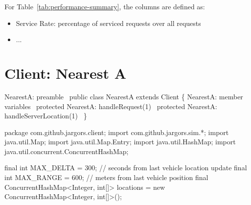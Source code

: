 For Table~\ref{tab:performance-summary}, the columns are defined as:

\begin{itemize}
\item Service Rate: percentage of serviced requests over all requests
\item ...
\end{itemize}


\nwenddocs{}\chapter{Client: Nearest A}
\label{client-nearest-a}

\nwenddocs{}\endmoddef\nwstartdeflinemarkup\nwenddeflinemarkup
\LA{}NearestA: preamble~{\nwtagstyle{}}\RA{}
public class NearestA extends Client \{
  \LA{}NearestA: member variables~{\nwtagstyle{}}\RA{}
  protected \LA{}NearestA: handleRequest(1)~{\nwtagstyle{}}\RA{}
  protected \LA{}NearestA: handleServerLocation(1)~{\nwtagstyle{}}\RA{}
\}
\nwendcode{}\nwdocspar

\nwenddocs{}\endmoddef\nwstartdeflinemarkup{}\nwenddeflinemarkup
package com.github.jargors.client;
import com.github.jargors.sim.*;
import java.util.Map;
import java.util.Map.Entry;
import java.util.HashMap;
import java.util.concurrent.ConcurrentHashMap;
\nwendcode{}\nwdocspar

\nwenddocs{}\endmoddef\nwstartdeflinemarkup{}\nwenddeflinemarkup
final int MAX_DELTA = 300;  // seconds from last vehicle location update
final int MAX_RANGE = 600;  // meters from last vehicle position
final ConcurrentHashMap<Integer, int[]> locations =
  new ConcurrentHashMap<Integer, int[]>();
\nwendcode{}\nwdocspar

